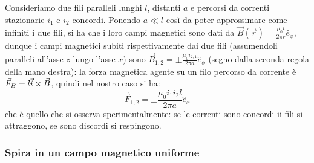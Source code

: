 \documentclass[]{article}
\begin{document}
Consideriamo due fili paralleli lunghi $ l $, distanti $ a $ e percorsi da correnti stazionarie $ i_1 $ e $ i_2 $ concordi. Ponendo $ a \ll l $ così da poter approssimare come infiniti i due fili, si ha che i loro campi magnetici sono dati da $ \vec{B}(\vec{r}) = \frac{\mu_0 i}{2\pi r} \hat{e}_{\phi} $, dunque i campi magnetici subiti rispettivamente dai due fili (assumendoli paralleli all'asse $ z $ lungo l'asse $ x $) sono $ \vec{B}_{1,2} = \pm \frac{\mu_0 i_{2,1}}{2\pi a} \hat{e}_{\phi} $ (segno dalla seconda regola della mano destra): la forza magnetica agente su un filo percorso da corrente è $ \vec{F}_B = l \vec{i}\times\vec{B} $, quindi nel nostro caso si ha:
\begin{equation}
	\vec{F}_{1,2} = \pm \frac{\mu_0 i_1 i_2 l}{2 \pi a} \hat{e}_x
	\label{eq:forza-fili}
\end{equation}
che è quello che si osserva sperimentalmente: se le correnti sono concordi ii fili si attraggono, se sono discordi si respingono.

\subsubsection{Spira in un campo magnetico uniforme}
\end{document}
